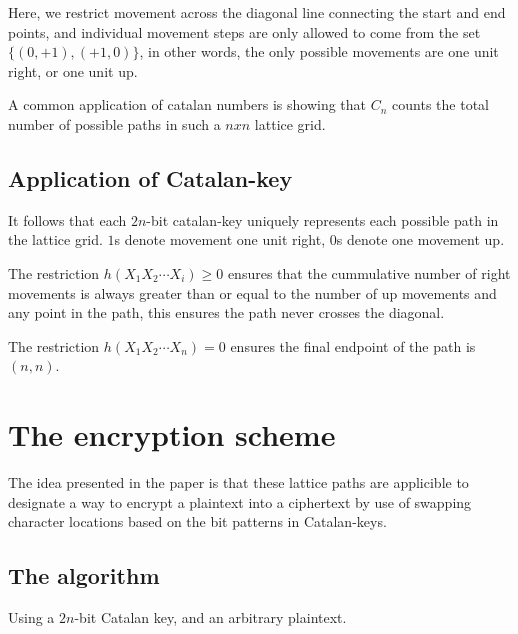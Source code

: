 \documentclass[12pt]{article} %
\begin{document}
Here, we restrict movement across the diagonal line connecting the start and end points, and individual movement steps are only allowed to come from the set $\{(0,+1), (+1,0)\}$, in other words, the only possible movements are one unit right, or one unit up.

A common application of catalan numbers is showing that $C_n$ counts the total number of possible paths in such a $n x n$ lattice grid.

\subsection{Application of Catalan-key}

It follows that each $2n$-bit catalan-key uniquely represents each possible path in the lattice grid. $1$s denote movement one unit right, $0$s denote one movement up.

The restriction $ h(X_1 X_2 \cdots X_i) \geq 0$ ensures that the cummulative number of right movements is always greater than or equal to the number of up movements and any point in the path, this ensures the path never crosses the diagonal.

The restriction $h(X_1 X_2 \cdots X_n) = 0$ ensures the final endpoint of the path is $(n,n)$.

\section{The encryption scheme}

The idea presented in the paper is that these lattice paths are applicible to designate a way to encrypt a plaintext into a ciphertext by use of swapping character locations based on the bit patterns in Catalan-keys.

\subsection{The algorithm}

Using a $2n$-bit Catalan key, and an arbitrary plaintext.
\end{document}
